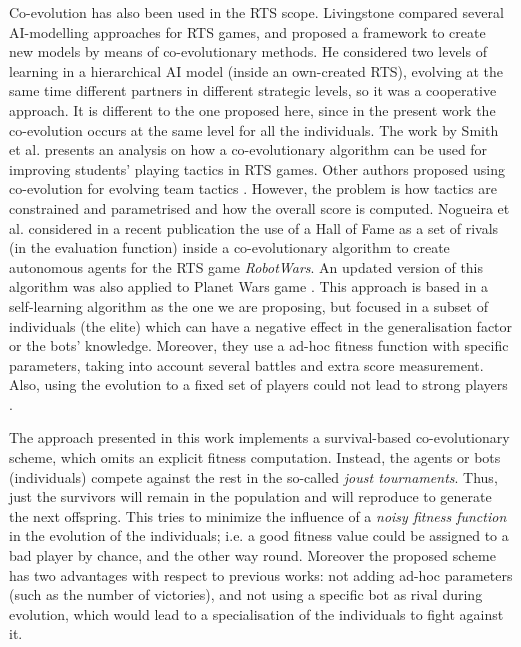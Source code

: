 \documentclass[conference]{IEEEtran}
\begin{document}
Co-evolution has also been used in the RTS scope. Livingstone \cite{Livinstone_RTS2005} compared several AI-modelling approaches for RTS games, and proposed a framework to create new models by means of co-evolutionary methods. He considered two levels of learning in a hierarchical AI model (inside an own-created RTS), evolving at the same time different partners in different strategic levels, so it was a cooperative approach. It is different to the one proposed here, since in the present work the co-evolution occurs at the same level for all the individuals.
The work by Smith et al. \cite{Smith_RTS_SpatialTactics2010} presents an analysis on how a co-evolutionary algorithm can be used for improving students' playing tactics in RTS games. Other authors proposed using co-evolution for evolving team tactics \cite{Avery_RTS_Team2010}. However, the problem is how tactics are constrained and parametrised and how the overall score is computed.
Nogueira et al. \cite{Nogueira_HoF2013} considered in a recent
publication the use of a Hall of Fame as a set of rivals (in the
evaluation function) inside a co-evolutionary algorithm to create
autonomous agents for the RTS game {\em RobotWars}. An updated version of this algorithm was also applied to Planet Wars game \cite{NogueiraCoevolutionary14}. This approach is based in a self-learning algorithm as the one we are proposing, but focused in a subset of individuals (the elite) which can have a negative effect in the generalisation factor or the bots' knowledge. Moreover, they use a ad-hoc fitness function with specific parameters, taking into account several battles and extra score measurement. Also, using the evolution to a fixed set of players could not lead to strong players \cite{Coevolving13Samothrakis}.

The approach presented in this work implements a survival-based co-evolutionary scheme, which omits an explicit fitness computation. Instead, the agents or bots (individuals) compete against the rest in the so-called \textit{joust tournaments}. Thus, just the survivors will remain in the population and will reproduce to generate the next offspring.
This tries to minimize the influence of a \textit{noisy fitness function} \cite{Genebot_JCST} in the evolution of the individuals; i.e. a good fitness value could be assigned to a bad player by chance, and the other way round. Moreover the proposed scheme has two advantages with respect to previous works: not adding ad-hoc parameters (such as the number of victories), and not using a specific bot as rival during evolution, which would lead to a specialisation of the individuals to fight against it.
\end{document}
